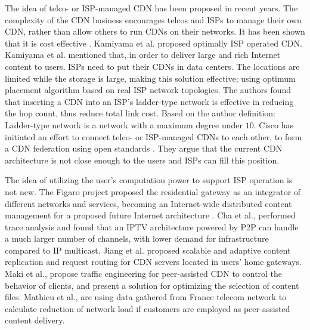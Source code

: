 \documentclass[10pt,final,journal,a4paper]{IEEEtran}
\begin{document}
The idea of telco- or ISP-managed CDN has been proposed in recent years.  
The complexity of the CDN business encourages telcos and ISPs to manage their own CDN, rather than allow others to run CDNs on their networks.  
It has been shown that it is cost effective \cite{federation}\cite{norton2011internet}. 
Kamiyama et al. \cite{NoriakiKAMIYAMA2013} proposed optimally ISP operated CDN.
Kamiyama et al. mentioned that, in order to deliver large and rich Internet content to users, ISPs need to put their CDNs in data centers.  
The locations are limited while the storage is large, making this solution effective; using optimum placement algorithm based on real ISP network topologies.  
The authors found that inserting a CDN into an ISP's ladder-type network is effective in reducing the hop count, thus reduce total link cost.  
Based on the author definition: Ladder-type network is a network with a maximum degree under $10$.
Cisco has initiated an effort to connect telco- or ISP-managed CDNs to each other, to form a CDN federation \cite{federation} using open standards \cite{cdni}.  
They argue that the current CDN architecture is not close enough to the users and ISPs can fill this position.

The idea of utilizing the user's computation power to support ISP operation is not new.  
The Figaro project \cite{figaro} proposed the residential gateway as an integrator of different networks and services, becoming an Internet-wide distributed content management for a proposed future Internet architecture \cite{figaro}.  
Cha et al.,\cite{Cha:2008:NTP:1855641.1855646} performed trace analysis and found that an IPTV architecture powered by P2P can handle a much larger number of channels, with lower demand for infrastructure compared to IP multicast.  
Jiang et al. \cite{Jiang:2012:OMD:2413176.2413193} proposed scalable and adaptive content replication and request routing for CDN servers located in users' home gateways.  
Maki et al.,\cite{NaoyaMAKI2012} propose traffic engineering for peer-assisted CDN to control the behavior of clients, and present a solution for optimizing the selection of content files.
Mathieu et al., \cite{6249305} are using data gathered from France telecom network to calculate reduction of network load if customers are employed as peer-assisted content delivery.
\end{document}
